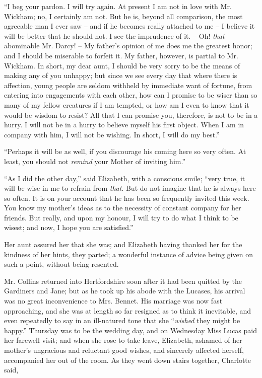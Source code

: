 “I beg your pardon. I will try again. At present I am
not in love with Mr. Wickham; no, I certainly am not.
But he is, beyond all comparison, the most agreeable
man I ever saw -- and if he becomes really attached to me -- I
believe it will be better that he should not. I see the
imprudence of it. -- Oh! \textit{that} abominable Mr. Darcy! -- My
father’s opinion of me does me the greatest honor;
and I should be miserable to forfeit it. My father, however,
is partial to Mr. Wickham. In short, my dear aunt,
I should be very sorry to be the means of making any
of you unhappy; but since we see every day that where
there is affection, young people are seldom withheld by
immediate want of fortune, from entering into engagements
with each other, how can I promise to be wiser
than so many of my fellow creatures if I am tempted,
or how am I even to know that it would be wisdom to
resist? All that I can promise you, therefore, is not to
be in a hurry. I will not be in a hurry to believe myself
his first object. When I am in company with him, I will
not be wishing. In short, I will do my best.”

“Perhaps it will be as well, if you discourage his coming
here so very often. At least, you should not \textit{remind} your
Mother of inviting him.”

“As I did the other day,” said Elizabeth, with a conscious
smile; “very true, it will be wise in me to
refrain from \textit{that}. But do not imagine that he is always
here so often. It is on your account that he has been so
frequently invited this week. You know my mother’s
ideas as to the necessity of constant company for her
friends. But really, and upon my honour, I will try to
do what I think to be wisest; and now, I hope you are
satisfied.”

Her aunt assured her that she was; and Elizabeth
having thanked her for the kindness of her hints, they
parted; a wonderful instance of advice being given on
such a point, without being resented.

Mr. Collins returned into Hertfordshire soon after it had
been quitted by the Gardiners and Jane; but as he took
up his abode with the Lucases, his arrival was no great
inconvenience to Mrs. Bennet. His marriage was now
fast approaching, and she was at length so far resigned
as to think it inevitable, and even repeatedly to say in
an ill-natured tone that she “\textit{wished} they might be happy.”
Thursday was to be the wedding day, and on Wednesday
Miss Lucas paid her farewell visit; and when she rose
to take leave, Elizabeth, ashamed of her mother’s
ungracious and reluctant good wishes, and sincerely affected
herself, accompanied her out of the room. As they went
down stairs together, Charlotte said,

